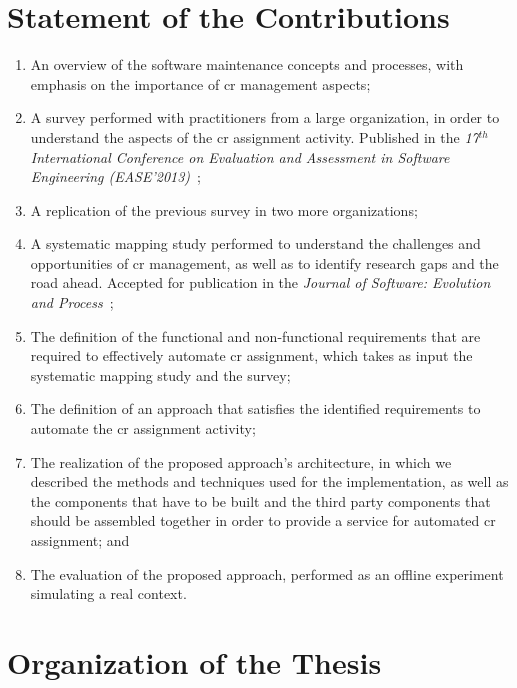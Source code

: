 \section{Statement of the Contributions}
\lipsum[6-7]

\begin{enumerate}
  \item An overview of the software maintenance concepts and processes, with
  emphasis on the importance of \ac{cr} management aspects; 
  \item A survey performed with practitioners from a large organization, in
  order to understand the aspects of the \ac{cr} assignment
  activity. Published in the \emph{17$^{th}$ International Conference on Evaluation
  and Assessment in Software Engineering (EASE'2013)}~\citep{CavalcantiEASE2013};
  \item A replication of the previous survey in two more organizations;
  \item A systematic mapping study performed to understand the challenges and
  opportunities of \ac{cr} management, as well as to identify research gaps and
  the road ahead. Accepted for publication in the
  \emph{Journal of Software: Evolution and Process}~\citep{CavalcantiJSEP2013};
  \item The definition of the functional and non-functional requirements that
  are required to effectively automate \ac{cr} assignment, which takes as input
  the systematic mapping study and the survey;
  \item The definition of an approach that satisfies the
  identified requirements to automate the \ac{cr} assignment activity;
  \item The realization of the proposed approach's architecture, in which we
  described the methods and techniques used for the implementation, as well as the
  components that have to be built and the third party components that should be
  assembled together in order to provide a service for automated \ac{cr}
  assignment; and
  \item The evaluation of the proposed approach, performed as an offline
  experiment simulating a real context.
\end{enumerate}

\section{Organization of the Thesis}

\lipsum[5-10]